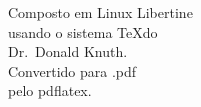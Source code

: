 \cleardoublepage
\thispagestyle{empty}
	\begin{center}
	\vspace*{\fill}
	\vspace*{\fill}
	\end{center}

\cleardoublepage
\thispagestyle{empty}
\vspace*{\fill}
	\begin{flushright}
	{\large 
	Composto em Linux Libertine\\
	usando o sistema \TeX do{}\\
	Dr.~Donald Knuth. \\
	Convertido para .pdf \\
	pelo pdflatex.\\}
	\end{flushright}
